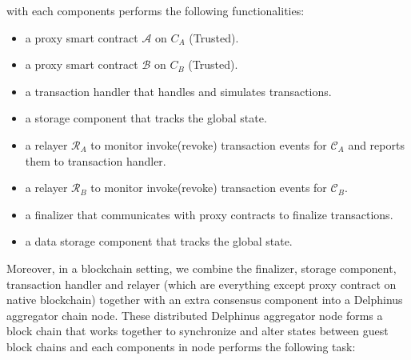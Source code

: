 \documentclass[pageno]{jpaper}
\begin{document}
with each components performs the following functionalities:
\begin{itemize}
\item  a proxy smart contract $\mathcal{A}$ on $C_{A}$ (Trusted).
\item  a proxy smart contract $\mathcal{B}$ on $C_{B}$ (Trusted).
\item  a transaction handler that handles and simulates transactions.
\item  a storage component that tracks the global state.
\item  a relayer $\mathcal{R}_A$ to monitor invoke(revoke) transaction events for $\mathcal{C}_A$ and reports them to transaction handler.
\item  a relayer $\mathcal{R}_B$ to monitor invoke(revoke) transaction events for $\mathcal{C}_B$.
\item  a finalizer that communicates with proxy contracts to finalize transactions.
\item  a data storage component that tracks the global state.
\end{itemize}
Moreover, in a blockchain setting, we combine the finalizer, storage component, transaction handler and relayer (which are everything except proxy contract on native blockchain) together with an extra consensus component into a Delphinus aggregator chain node. These distributed Delphinus aggregator node forms a block chain that works together to synchronize and alter states between guest block chains and each components in node performs the following task:
\end{document}
